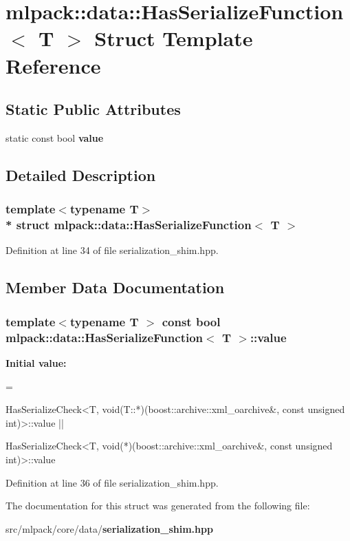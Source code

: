 \section{mlpack\+:\+:data\+:\+:Has\+Serialize\+Function$<$ T $>$ Struct Template Reference}
\label{structmlpack_1_1data_1_1HasSerializeFunction}
\subsection*{Static Public Attributes}
\begin{DoxyCompactItemize}
\item 
static const bool {\bf value}
\end{DoxyCompactItemize}


\subsection{Detailed Description}
\subsubsection*{template$<$typename T$>$\\*
struct mlpack\+::data\+::\+Has\+Serialize\+Function$<$ T $>$}



Definition at line 34 of file serialization\+\_\+shim.\+hpp.



\subsection{Member Data Documentation}
\subsubsection[{value}]{\setlength{\rightskip}{0pt plus 5cm}template$<$typename T $>$ const bool {\bf mlpack\+::data\+::\+Has\+Serialize\+Function}$<$ T $>$\+::value\hspace{0.3cm}{\ttfamily [static]}}\label{structmlpack_1_1data_1_1HasSerializeFunction_a8dfefd9fd5ae969bf29811a18056a180}
{\bfseries Initial value\+:}
\begin{DoxyCode}
=
      
      HasSerializeCheck<T, void(T::*)(boost::archive::xml\_oarchive&,
                                      \textcolor{keyword}{const} \textcolor{keywordtype}{unsigned} int)>::value ||
      
      HasSerializeCheck<T, \textcolor{keywordtype}{void}(*)(boost::archive::xml\_oarchive&,
                                   \textcolor{keyword}{const} \textcolor{keywordtype}{unsigned} int)>::value
\end{DoxyCode}


Definition at line 36 of file serialization\+\_\+shim.\+hpp.



The documentation for this struct was generated from the following file\+:\begin{DoxyCompactItemize}
\item 
src/mlpack/core/data/{\bf serialization\+\_\+shim.\+hpp}\end{DoxyCompactItemize}
